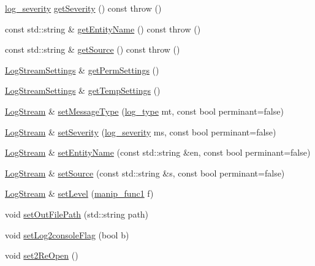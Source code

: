 \begin{DoxyCompactItemize}
\item 
\hyperlink{a00089_a2479a56cdedf21357ca5c68adc699d00}{log\-\_\-severity} \hyperlink{a00031_a8deec7dc1e77cdf99e99d8be56660151}{get\-Severity} () const   throw ()
\item 
const std\-::string \& \hyperlink{a00031_a37cf1aef25583d4544d149d5f2c7abe6}{get\-Entity\-Name} () const   throw ()
\item 
const std\-::string \& \hyperlink{a00031_a9c62fef30deb7557b7920580ab4a389a}{get\-Source} () const   throw ()
\item 
\hyperlink{a00032}{Log\-Stream\-Settings} \& \hyperlink{a00031_a3b4c04dc683fdd8bcf54b3bdcb2906a0}{get\-Perm\-Settings} ()
\item 
\hyperlink{a00032}{Log\-Stream\-Settings} \& \hyperlink{a00031_a7a5c468e5c33c028737a733c7510bc74}{get\-Temp\-Settings} ()
\item 
\hyperlink{a00031}{Log\-Stream} \& \hyperlink{a00031_a318a573183c8b552131a4225df381d9f}{set\-Message\-Type} (\hyperlink{a00089_a18db16d1f4c281bec16e637c56b0cc88}{log\-\_\-type} mt, const bool perminant=false)
\item 
\hyperlink{a00031}{Log\-Stream} \& \hyperlink{a00031_a7cb243c196903798707fc08b1cbb32c9}{set\-Severity} (\hyperlink{a00089_a2479a56cdedf21357ca5c68adc699d00}{log\-\_\-severity} ms, const bool perminant=false)
\item 
\hyperlink{a00031}{Log\-Stream} \& \hyperlink{a00031_adaf27d5069674b2e934883c107187686}{set\-Entity\-Name} (const std\-::string \&en, const bool perminant=false)
\item 
\hyperlink{a00031}{Log\-Stream} \& \hyperlink{a00031_ad30c66fcfcaebbc51bb9abf2c31e4cae}{set\-Source} (const std\-::string \&s, const bool perminant=false)
\item 
\hyperlink{a00031}{Log\-Stream} \& \hyperlink{a00031_afbccf2eeb34441a14113b29b89c15f88}{set\-Level} (\hyperlink{a00031_ab6994c757d4c63c4388a932cf2be2c9d}{manip\-\_\-func1} f)
\item 
void \hyperlink{a00031_afb35292a073160d5fc74b1e94512226e}{set\-Out\-File\-Path} (std\-::string path)
\item 
void \hyperlink{a00031_ab9813d6efb18c2533dd0489306af5f3d}{set\-Log2console\-Flag} (bool b)
\item 
void \hyperlink{a00031_a739a620e8f2e957e79cfbdd3e7f58500}{set2\-Re\-Open} ()
\end{DoxyCompactItemize}


